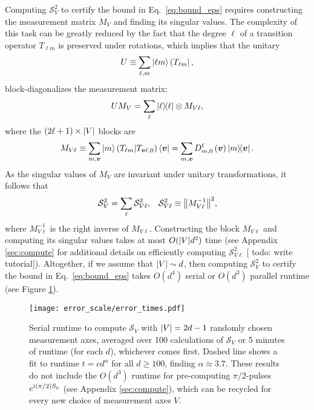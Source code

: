 \documentclass[notitlepage,twocolumn]{revtex4-2}
\newcommand{\p}[1]{\left(#1\right)} %
\renewcommand{\v}{\bm} %
\renewcommand{\i}{\mathrm{i}\mkern1mu} %
\newcommand{\y}{\text{y}}
\renewcommand{\S}{\mathcal{S}}
\def\obra#1{\mathinner{({#1}|}}
\def\obk#1{\mathinner{({#1})}}
\newcommand{\red}[1]{{\color{red} #1}}
\begin{document}
Computing $\S_V^2$ to certify the bound in Eq.~\eqref{eq:bound_eps} requires constructing the measurement matrix $M_V$ and finding its singular values.
The complexity of this task can be greatly reduced by the fact that the degree $\ell$ of a transition operator $T_{\ell m}$ is preserved under rotations, which implies that the unitary
\begin{align}
  U \equiv \sum_{\ell,m} \ket{\ell m} \obra{T_{\ell m}},
\end{align}
block-diagonalizes the measurement matrix:
\begin{align}
  U M_V = \sum_\ell \op{\ell} \otimes M_{V\ell},
\end{align}
where the $\p{2\ell+1}\times\abs{V}$ blocks are
\begin{align}
  M_{V\ell} \equiv \sum_{m,\v v} \ket{m} \obk{T_{\ell m}|T_{\v v\ell,0}} \bra{\v v}
  = \sum_{m,\v v} D^\ell_{m,0}\p{\v v} \op{m}{\v v}.
\end{align}
As the singular values of $M_V$ are invariant under unitary transformations, it follows that
\begin{align}
  \S_V^2 = \sum_\ell \S_{V\ell}^2,
  &&
  \S_{V\ell}^2 \equiv \norm{M_{V\ell}^{-1}}^2,
\end{align}
where $M_{V\ell}^{-1}$ is the right inverse of $M_{V\ell}$.
Constructing the block $M_{V\ell}$ and computing its singular values takes at most $O(\abs{V}d^2)$ time (see Appendix \ref{sec:compute} for additional details on efficiently computing $\S_{V\ell}^2$ [\red{todo: write tutorial}]).
Altogether, if we assume that $\abs{V}\sim d$, then computing $\S_V^2$ to certify the bound in Eq.~\eqref{eq:bound_eps} takes $O(d^4)$ serial or $O(d^3)$ parallel runtime (see Figure \ref{fig:times}).

\begin{figure}
  \centering
  \texttt{[image: error\_scale/error\_times.pdf]}
  \caption{Serial runtime to compute $\S_V$ with $\abs{V}=2d-1$ randomly chosen measurement axes, averaged over 100 calculations of $\S_V$ or 5 minutes of runtime (for each $d$), whichever comes first.
    Dashed line shows a fit to runtime $t=c d^\alpha$ for all $d\ge100$, finding $\alpha\approx 3.7$.
    These results do not include the $O(d^3)$ runtime for pre-computing $\pi/2$-pulses $e^{\i\p{\pi/2}S_\y}$ (see Appendix \ref{sec:compute}), which can be recycled for every new choice of measurement axes $V$.}
  \label{fig:times}
\end{figure}
\end{document}
